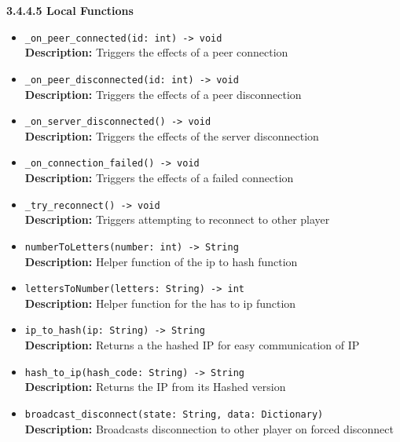 \documentclass[12pt, titlepage]{article}
\begin{document}
\textbf{3.4.4.5 Local Functions}
\begin{itemize}
    \item \texttt{\_on\_peer\_connected(id: int) -> void}\\
    \textbf{Description:} Triggers the effects of a peer connection
    
    \item \texttt{\_on\_peer\_disconnected(id: int) -> void}\\
    \textbf{Description:} Triggers the effects of a peer disconnection
    
    \item \texttt{\_on\_server\_disconnected() -> void}\\
    \textbf{Description:} Triggers the effects of the server disconnection
    
    \item \texttt{\_on\_connection\_failed() -> void}\\
    \textbf{Description:} Triggers the effects of a failed connection
    
    \item \texttt{\_try\_reconnect() -> void}\\
    \textbf{Description:} Triggers attempting to reconnect to other player
    
    \item \texttt{numberToLetters(number: int) -> String}\\
    \textbf{Description:} Helper function of the ip to hash function
    
    \item \texttt{lettersToNumber(letters: String) -> int}\\
    \textbf{Description:} Helper function for the has to ip function
    
    \item \texttt{ip\_to\_hash(ip: String) -> String}\\
    \textbf{Description:} Returns a the hashed IP for easy communication of IP
    
    \item \texttt{hash\_to\_ip(hash\_code: String) -> String}\\
    \textbf{Description:} Returns the IP from its Hashed version
    
    \item \texttt{broadcast\_disconnect(state: String, data: Dictionary)}\\
    \textbf{Description:} Broadcasts disconnection to other player on forced disconnect
    

\end{itemize}
\end{document}
